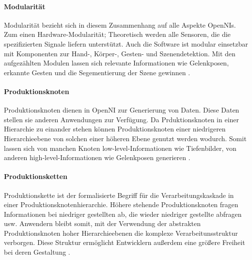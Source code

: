 \paragraph{Modularität}
Modularität bezieht sich in diesem Zusammenhang auf alle Aspekte OpenNIs.
Zum einen Hardware-Modularität;
Theoretisch werden alle Sensoren, die die spezifizierten Signale liefern unterstützt.
Auch die Software ist modular einsetzbar mit Komponenten zur Hand-, Körper-, Gesten- und Szenendetektion.
Mit den aufgezählten Modulen lassen sich relevante Informationen wie Gelenkposen, erkannte Gesten und die Segementierung der Szene gewinnen \cite{kinect_6}.

\paragraph{Produktionsknoten}
Produktionsknoten dienen in OpenNI zur Generierung von Daten.
Diese Daten stellen sie anderen Anwendungen zur Verfügung.
Da Prduktionsknoten in einer Hierarchie zu einander stehen können Produktionsknoten einer niedrigeren Hierarchieebene von solchen einer höheren Ebene genutzt werden wodurch.
Somit lassen sich von manchen Knoten low-level-Informationen wie Tiefenbilder, von anderen high-level-Informationen wie Gelenkposen generieren \cite{kinect_6}.

\paragraph{Produktionsketten}
Produktionskette ist der formalisierte Begriff für die Verarbeitungskaskade in einer Produktionsknotenhierarchie.
Höhere stehende Produktionsknoten fragen Informationen bei niedriger gestellten ab, die wieder niedriger gestellte abfragen usw.
Anwendern bleibt somit, mit der Verwendung der abstrakten Produktionsknoten hoher Hierarchieebenen die komplexe Verarbeitunsstruktur verborgen.
Diese Struktur ermöglicht Entwicklern außerdem eine größere Freiheit bei deren Gestaltung \cite{kinect_6}.

